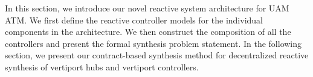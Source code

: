 In this section, we introduce our novel reactive system architecture for UAM ATM. We first define the reactive controller models for the individual components in the architecture. We then construct the composition of all the controllers and present the formal synthesis problem statement. In the following section, we present our contract-based synthesis method for decentralized reactive synthesis of vertiport hubs and vertiport controllers. 



 










